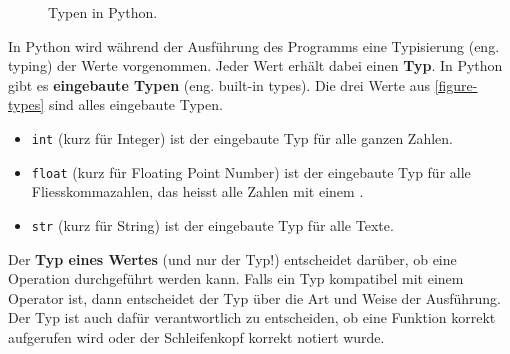\begin{figure}[htb]
\begin{minipage}{0.45\textwidth}
{
}
\caption{Typen in Python.}
\label{figure-types}
\end{minipage}
\end{figure}

In Python wird während der Ausführung des Programms eine Typisierung (eng. typing) der Werte vorgenommen. Jeder Wert erhält dabei einen \textbf{Typ}. In Python gibt es \textbf{eingebaute Typen} (eng. built-in types). Die drei Werte aus \autoref{figure-types} sind alles eingebaute Typen.

\begin{itemize}
\item \lstinline{int} (kurz für Integer) ist der eingebaute Typ für alle ganzen Zahlen.
\item \lstinline{float} (kurz für Floating Point Number) ist der eingebaute Typ für alle Fliesskommazahlen, das heisst alle Zahlen mit einem .
\item \lstinline{str} (kurz für String) ist der eingebaute Typ für alle Texte.
\end{itemize}

\begin{important}
Der \textbf{Typ eines Wertes} (und nur der Typ!) entscheidet darüber, ob eine Operation durchgeführt werden kann. Falls ein Typ kompatibel mit einem Operator ist, dann entscheidet der Typ über die Art und Weise der Ausführung. Der Typ ist auch dafür verantwortlich zu entscheiden, ob eine Funktion korrekt aufgerufen wird oder der Schleifenkopf korrekt notiert wurde.
\end{important}

